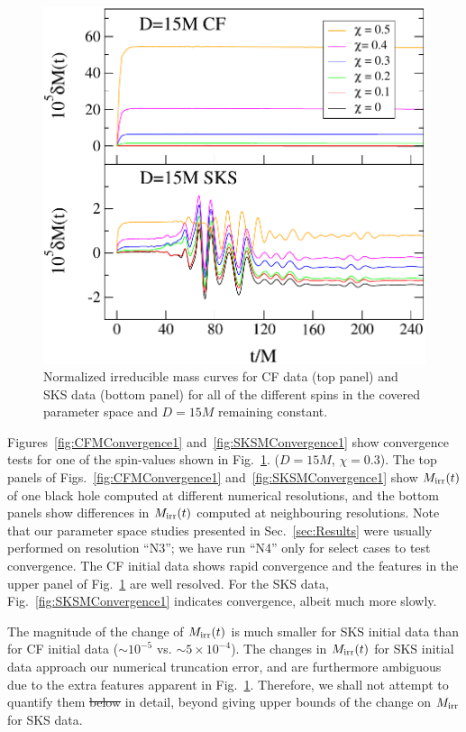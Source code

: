 \documentclass[aps,prd,amsmath,floatfix,twocolumn,superscriptaddress,nofootinbib,showpacs]{revtex4-1}
\theoremstyle{plain}
\theoremstyle{definition}
\newcommand{\harald}[1]{\textcolor{OliveGreen}{#1}}
\begin{document}
\begin{figure}
 \includegraphics[width=0.98\columnwidth]{MassIncreaseCFSKS}
  \caption{Normalized irreducible mass curves for CF data (top panel)
    and SKS data (bottom panel) for all of the different spins in the
    covered parameter space and $D=15M$ remaining constant. }
  \label{fig:MassIncreaseCFSKS}
\end{figure}

Figures~\ref{fig:CFMConvergence1} and~\ref{fig:SKSMConvergence1} show
convergence tests for one of the spin-values shown in
Fig.~\ref{fig:MassIncreaseCFSKS}.  ($D=15M$, $\chi=0.3$).  The top
panels of Figs.~\ref{fig:CFMConvergence1}
and~\ref{fig:SKSMConvergence1} show $M_{\rm irr}(t)$ of one black hole
computed at different numerical resolutions, and the bottom panels
show differences in $M_{\rm irr}(t)$ computed at neighbouring
resolutions.  Note that our parameter space studies presented in
Sec.~\ref{sec:Results} were usually performed on resolution ``N3''; we
have run ``N4'' only for select cases to test convergence.  The CF
initial data shows rapid convergence and the features in the upper
panel of Fig.~\ref{fig:MassIncreaseCFSKS} are well resolved.  For the
SKS data, Fig.~\ref{fig:SKSMConvergence1} indicates convergence,
albeit much more slowly.

The magnitude of the change of $M_{\rm irr}(t)$ is much smaller for
SKS initial data than for CF initial data ($\sim 10^{-5}$ vs. $\sim
5\times 10^{-4}$).  The changes in $M_{\rm irr}(t)$ for SKS initial
data approach our numerical truncation error, and are furthermore
ambiguous due to the extra features apparent in
Fig.~\ref{fig:MassIncreaseCFSKS}.  Therefore, we shall not attempt to
quantify them \harald{\sout{below} in detail}, beyond giving upper bounds of the change on
$M_{\rm irr}$ for SKS data.
\end{document}
